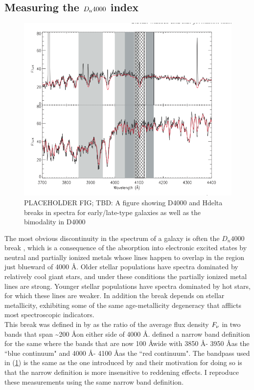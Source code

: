 \subsection{Measuring the $D_{\rm n}4000$ index}
\begin{figure}
\includegraphics[width=\textwidth]{figures/spectra_placeholder.png}
\caption[PLACEHOLDER FIG; TBD: A figure showing D4000 and Hdelta breaks in spectra for early/late-type galaxies as well as the bimodality in D4000
]{ PLACEHOLDER FIG; TBD: A figure showing D4000 and Hdelta breaks in spectra for early/late-type galaxies as well as the bimodality in D4000
\label{fig:early_late_type}}
\end{figure}
The most obvious discontinuity in the spectrum of a galaxy is often the $D_{n}4000$ break \citep{1999ApJ...527...54B}, which is a consequence of the absorption into electronic excited states by neutral and partially ionized metals whose lines happen to overlap in the region just blueward of 4000 \AA.  Older stellar populations have spectra dominated by relatively cool giant stars, and under these conditions the partially ionized metal lines are strong. Younger stellar populations have spectra dominated by hot stars, for which these lines are weaker. In addition the break
depends on stellar metallicity, exhibiting some of the same age-metallicity degeneracy that afflicts most spectroscopic indicators.\\ 

This break was defined in by \citet{bruzual_a._spectral_1983-2} as the ratio of the average flux density $F_{\rm \nu}$ in two bands that span \textasciitilde200 \AA on either side of 4000 \AA. \citet{1999ApJ...527...54B} defined a narrow band definition for the same where the bands that are now 100 \AA wide with 3850 \AA - 3950 \AA as the ``blue continuum" and 4000 \AA - 4100 \AA as the ``red continuum". The bandpass used in \citet{kauffmann_stellar_2003} (\ref{fig:early_late_type}) is the same as the one introduced by \citet{1999ApJ...527...54B} and their motivation for doing so is that the narrow definition is more insensitive to reddening effects. I reproduce these measurements using the same narrow band definition.\\

